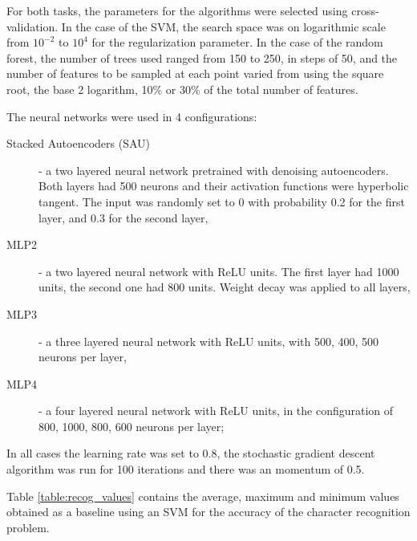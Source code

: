 For both tasks, the parameters for the algorithms were selected using cross-validation. In the case of the SVM, the search space was on logarithmic scale from $10^{-2}$ to $10^4$ for the regularization parameter. In the case of the random forest, the number of trees used ranged from 150 to 250, in steps of 50, and the number of features to be sampled at each point varied from using the square root, the base 2 logarithm, 10\% or 30\% of the total number of features.

The neural networks were used in 4 configurations: 

\begin{description}


\item[Stacked Autoencoders (SAU)] - a two layered neural network pretrained with denoising autoencoders. Both layers had 500 neurons and their activation functions were hyperbolic tangent.  The input was randomly set to 0 with probability 0.2 for the first layer, and 0.3 for the second layer,
\item[MLP2] - a two layered neural network with ReLU units. The first layer had 1000 units, the second one had 800 units. Weight decay was applied to all layers,
\item[MLP3] - a three layered neural network with ReLU units, with 500, 400, 500 neurons per layer,
\item[MLP4] - a four layered neural network with ReLU units, in the configuration of 800, 1000, 800, 600 neurons per layer;
\end{description}

In all cases the learning rate was set to 0.8, the stochastic gradient descent algorithm was run for 100 iterations and there was an momentum of 0.5.

Table \ref{table:recog_values} contains the average, maximum and minimum values obtained as a baseline using an SVM for the accuracy of the character recognition problem.

